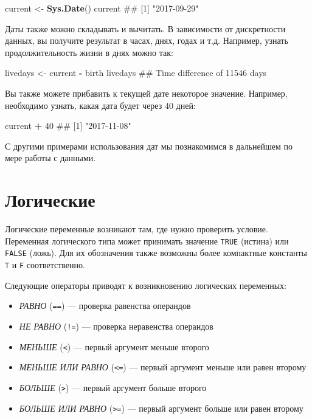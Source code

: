\documentclass[]{book}
\newenvironment{Shaded}{\begin{snugshade}}{\end{snugshade}}
\newcommand{\KeywordTok}[1]{\textcolor[rgb]{0.13,0.29,0.53}{\textbf{#1}}}
\newcommand{\DecValTok}[1]{\textcolor[rgb]{0.00,0.00,0.81}{#1}}
\newcommand{\StringTok}[1]{\textcolor[rgb]{0.31,0.60,0.02}{#1}}
\newcommand{\OperatorTok}[1]{\textcolor[rgb]{0.81,0.36,0.00}{\textbf{#1}}}
\newcommand{\NormalTok}[1]{#1}
\providecommand{\tightlist}{%
  \setlength{\itemsep}{0pt}\setlength{\parskip}{0pt}}
\begin{document}
\begin{Shaded}
\begin{Highlighting}[]
\NormalTok{current <-}\StringTok{ }\KeywordTok{Sys.Date}\NormalTok{()}
\NormalTok{current}
\NormalTok{## [1] "2017-09-29"}
\end{Highlighting}
\end{Shaded}

Даты также можно складывать и вычитать. В зависимости от дискретности
данных, вы получите результат в часах, днях, годах и т.д. Например,
узнать продолжительность жизни в днях можно так:

\begin{Shaded}
\begin{Highlighting}[]
\NormalTok{livedays <-}\StringTok{ }\NormalTok{current }\OperatorTok{-}\StringTok{ }\NormalTok{birth}
\NormalTok{livedays}
\NormalTok{## Time difference of 11546 days}
\end{Highlighting}
\end{Shaded}

Вы также можете прибавить к текущей дате некоторое значение. Например,
необходимо узнать, какая дата будет через 40 дней:

\begin{Shaded}
\begin{Highlighting}[]
\NormalTok{current }\OperatorTok{+}\StringTok{ }\DecValTok{40}
\NormalTok{## [1] "2017-11-08"}
\end{Highlighting}
\end{Shaded}

С другими примерами использования дат мы познакомимся в дальнейшем по
мере работы с данными.

\section{Логические}\label{booleans}

Логические переменные возникают там, где нужно проверить условие.
Переменная логического типа может принимать значение \texttt{TRUE}
(истина) или \texttt{FALSE} (ложь). Для их обозначения также возможны
более компактные константы \texttt{T} и \texttt{F} соответственно.

Следующие операторы приводят к возникновению логических переменных:

\begin{itemize}
\tightlist
\item
  \emph{РАВНО} (\texttt{==}) --- проверка равенства операндов
\item
  \emph{НЕ РАВНО} (\texttt{!=}) --- проверка неравенства операндов
\item
  \emph{МЕНЬШЕ} (\texttt{\textless{}}) --- первый аргумент меньше
  второго
\item
  \emph{МЕНЬШЕ ИЛИ РАВНО} (\texttt{\textless{}=}) --- первый аргумент
  меньше или равен второму
\item
  \emph{БОЛЬШЕ} (\texttt{\textgreater{}}) --- первый аргумент больше
  второго
\item
  \emph{БОЛЬШЕ ИЛИ РАВНО} (\texttt{\textgreater{}=}) --- первый аргумент
  больше или равен второму
\end{itemize}
\end{document}
